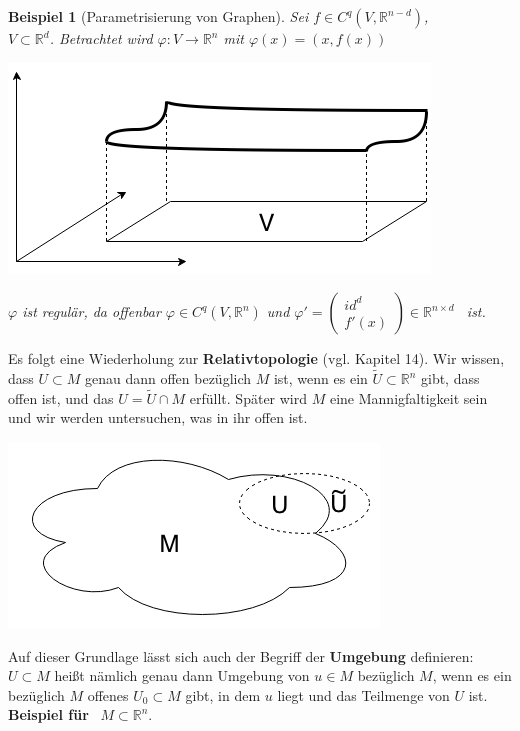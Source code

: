 \documentclass[a4paper,12pt,portrait]{book}
\theoremstyle{theoremstyle}
\newtheorem{beispiel}[theo]{Beispiel}
\begin{document}
\begin{beispiel}[Parametrisierung von Graphen]
Sei $f\in C^q(V,\mathbb{R}^{n-d})$,\\
$V\subset\mathbb{R}^d$. Betrachtet wird $\varphi:V\rightarrow\mathbb{R}^n$ mit $\varphi(x)=(x,f(x))$\\
    \begin{center}
    \includegraphics[scale=0.5]{pictures/MA2_0005}\\
    \end{center}
$\varphi$ ist regulär, da offenbar $\varphi\in C^q(V,\mathbb{R}^n)$ 
und $\varphi'=\begin{pmatrix} id^d \\ 
f'(x)
\end{pmatrix}\in\mathbb{R}^{n\times d}$ \ ist.\\
\linebreak
\end{beispiel}

Es folgt eine Wiederholung zur \textbf{Relativtopologie} (vgl. Kapitel 14). Wir wissen, dass $U\subset M$ genau dann offen bezüglich $M$ ist, wenn es ein $\tilde{U}\subset\mathbb{R}^n$ gibt, dass offen ist, und das $U=\tilde{U}\cap M$ erfüllt. Später wird $M$ eine Mannigfaltigkeit sein und wir werden untersuchen, was in ihr offen ist.\\

\begin{center}
\includegraphics[scale=0.5]{pictures/MA2_0006}\\
\end{center}
Auf dieser Grundlage lässt sich auch der Begriff der \textbf{Umgebung} definieren:\\
$U\subset M$ heißt nämlich genau dann Umgebung von $u\in M$ bezüglich $M$, wenn es ein bezüglich $M$ offenes $U_0\subset M$ gibt, in dem $u$ liegt und das Teilmenge von $U$ ist.\linebreak\linebreak
\newpage
\textbf{\textsf{Beispiel für}} \ $M\subset\mathbb{R}^n$.\\
\end{document}
